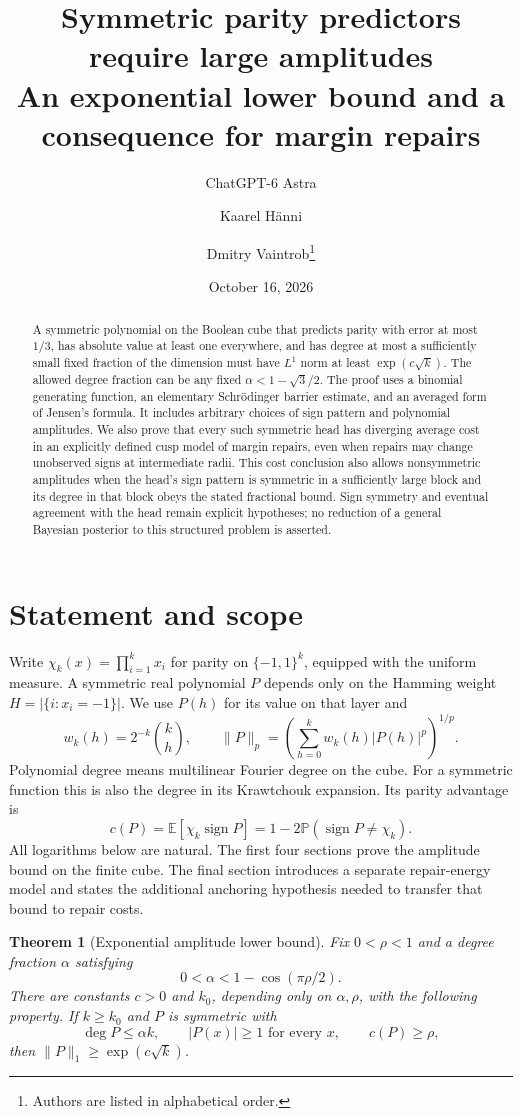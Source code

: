 \documentclass[11pt]{article}
\title{Symmetric parity predictors require large amplitudes\\
\large An exponential lower bound and a consequence for margin repairs}
\author{ChatGPT-6 Astra \and Kaarel H\"anni \and Dmitry Vaintrob\thanks{Authors are listed in alphabetical order.}}
\date{October 16, 2026}
\newtheorem{theorem}{Theorem}
\theoremstyle{remark}\newtheorem{remark}[theorem]{Remark}
\newcommand{\E}{\mathbb E}\newcommand{\Prb}{\mathbb P}
\DeclareMathOperator{\sign}{sign}
\begin{document}
\maketitle
\begin{abstract}
A symmetric polynomial on the Boolean cube that predicts parity with
error at most $1/3$, has absolute value at least one everywhere, and has
degree at most a sufficiently small fixed fraction of the dimension
must have $L^1$ norm at least $\exp(c\sqrt{k})$. The allowed degree
fraction can be any fixed $\alpha<1-\sqrt3/2$.
The proof uses a binomial generating function, an elementary
Schr\"odinger barrier estimate, and an averaged form of Jensen's formula. It includes arbitrary choices of
sign pattern and polynomial amplitudes. We also prove that every such
symmetric head has diverging average cost in an explicitly defined
cusp model of margin repairs, even when repairs may change unobserved
signs at intermediate radii. This cost conclusion also allows nonsymmetric
amplitudes when the head's
sign pattern is symmetric in a sufficiently large block and its degree
in that block obeys the stated fractional bound. Sign symmetry and eventual
agreement with the head remain
explicit hypotheses; no reduction of a general Bayesian posterior to
this structured problem is asserted.
\end{abstract}

\section{Statement and scope}
Write $\chi_k(x)=\prod_{i=1}^k x_i$ for parity on $\{-1,1\}^k$, equipped
with the uniform measure. A symmetric real polynomial $P$ depends only
on the Hamming weight $H=|\{i:x_i=-1\}|$. We use $P(h)$ for its value
on that layer and
\[
 w_k(h)=2^{-k}\binom{k}{h},\qquad
 \|P\|_p=\left(\sum_{h=0}^k w_k(h)|P(h)|^p\right)^{1/p}.
\]
Polynomial degree means multilinear Fourier degree on the cube. For a
symmetric function this is also the degree in its Krawtchouk expansion.
Its parity advantage is
\[
 c(P)=\E[\chi_k\sign P]=1-2\Prb(\sign P\ne\chi_k).
\]
All logarithms below are natural. The first four sections prove the
amplitude bound on the finite cube. The final section introduces a
separate repair-energy model and states the additional anchoring
hypothesis needed to transfer that bound to repair costs.

\begin{theorem}[Exponential amplitude lower bound]\label{thm:main}
Fix $0<\rho<1$ and a degree fraction $\alpha$ satisfying
\begin{equation}\label{eq:criterion}
 0<\alpha<1-\cos(\pi\rho/2).
\end{equation}
There are constants $c>0$ and $k_0$, depending only on $\alpha,\rho$,
with the following property. If $k\ge k_0$ and $P$ is symmetric with
\[
 \deg P\le\alpha k,\qquad |P(x)|\ge1\text{ for every }x,
 \qquad c(P)\ge\rho,
\]
then $\|P\|_1\ge\exp(c\sqrt{k})$.
\end{theorem}
\end{document}
